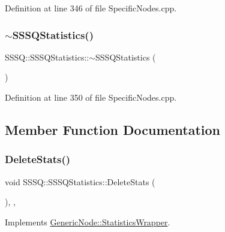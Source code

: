 Definition at line 346 of file Specific\+Nodes.\+cpp.

\mbox{\label{class_s_s_s_q_1_1_s_s_s_q_statistics_a6e067067219125f919a9ee526324363b}} 
\subsubsection{\texorpdfstring{$\sim$\+S\+S\+S\+Q\+Statistics()}{~SSSQStatistics()}}
{\footnotesize\ttfamily S\+S\+S\+Q\+::\+S\+S\+S\+Q\+Statistics\+::$\sim$\+S\+S\+S\+Q\+Statistics (\begin{DoxyParamCaption}{ }\end{DoxyParamCaption})\hspace{0.3cm}{\ttfamily [inline]}}



Definition at line 350 of file Specific\+Nodes.\+cpp.



\subsection{Member Function Documentation}
\mbox{\label{class_s_s_s_q_1_1_s_s_s_q_statistics_a8cddfec8ce3d2f4b31c15f3d07822b05}} 
\subsubsection{\texorpdfstring{Delete\+Stats()}{DeleteStats()}}
{\footnotesize\ttfamily void S\+S\+S\+Q\+::\+S\+S\+S\+Q\+Statistics\+::\+Delete\+Stats (\begin{DoxyParamCaption}{ }\end{DoxyParamCaption})\hspace{0.3cm}{\ttfamily [inline]}, {\ttfamily [override]}, {\ttfamily [virtual]}}



Implements \hyperlink{class_generic_node_1_1_statistics_wrapper_a08f3642bccd77ccf4d7a8b7010559e1c}{Generic\+Node\+::\+Statistics\+Wrapper}.



